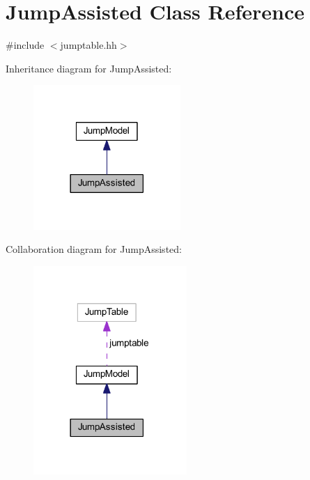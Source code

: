 \hypertarget{class_jump_assisted}{}\section{Jump\+Assisted Class Reference}
\label{class_jump_assisted}


{\ttfamily \#include $<$jumptable.\+hh$>$}



Inheritance diagram for Jump\+Assisted\+:
\nopagebreak
\begin{figure}[H]
\begin{center}
\leavevmode
\includegraphics[width=158pt]{class_jump_assisted__inherit__graph}
\end{center}
\end{figure}


Collaboration diagram for Jump\+Assisted\+:
\nopagebreak
\begin{figure}[H]
\begin{center}
\leavevmode
\includegraphics[width=165pt]{class_jump_assisted__coll__graph}
\end{center}
\end{figure}
